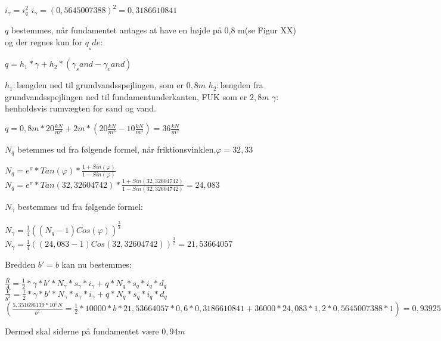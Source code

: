 \newline
\begin{center}
	$i_\gamma=i_q^2$
	$i_\gamma=(0,\!5645007388)^2=0,\!3186610841$
\end{center}
\newline
$q$ bestemmes, når fundamentet antages at have en højde på 0,8 m(se Figur XX) og der regnes kun for $q__ude$:
\begin{center}
	$q=h_1*\gamma+h_2*(\gamma_sand-\gamma_vand)$
\end{center}
\newline
$h_1:$længden ned til grundvandsspejlingen, som er $0,\!8m$
$h_2:$længden fra grundvandsspejlingen ned til fundamentunderkanten, FUK som er $2,\!8m$
$\gamma:$ henholdsvis rumvægten for sand og vand.
\newline
\begin{center}
	$q=0,\!8m*20\frac{kN}{m^3}+2m*(20\frac{kN}{m^3}-10\frac{kN}{m^3})=36\frac{kN}{m^2}$
\end{center}
\newline
$N_q$ betemmes ud fra følgende formel, når friktionsvinklen,$\varphi=32,\!33$
\begin{center}
	$N_q=e^\pi*Tan(\varphi)*\frac{1+Sin(\varphi)}{1-Sin(\varphi)}$
	$N_q=e^\pi*Tan(32,\!32604742)*\frac{1+Sin(32,\!32604742)}{1-Sin(32,\!32604742)}=24,\!083$
\end{center}
\newline
$N_\gamma$ bestemmes ud fra følgende formel: 
\begin{center}
	$N_\gamma=\frac{1}{4}((N_q-1)Cos(\varphi))^\frac{3}{2}$
	$N_\gamma=\frac{1}{4}((24,\!083-1)Cos(32,\!32604742))^\frac{3}{2}=21,\!53664057$
\end{center}
\newline 
Bredden $b'=b$ kan nu bestemmes: 
\begin{center}
	$\frac{R}{A}=\frac{1}{2}*\gamma*b'*N_\gamma*s_\gamma*i_\gamma+q*N_q*s_q*i_q*d_q$
	$\frac{V}{b^2}=\frac{1}{2}*\gamma*b'*N_\gamma*s_\gamma*i_\gamma+q*N_q*s_q*i_q*d_q$
	$(\frac{5,\!351696139*10^5N}{b^2}=\frac{1}{2}*10000*b*21,\!53664057*0,\!6*0,\!3186610841+36000*24,\!083*1,\!2*0,\!5645007388*1)=0,\!9392506518$
\end{center}
\newline
Dermed skal siderne på fundamentet være $0,\!94m$












